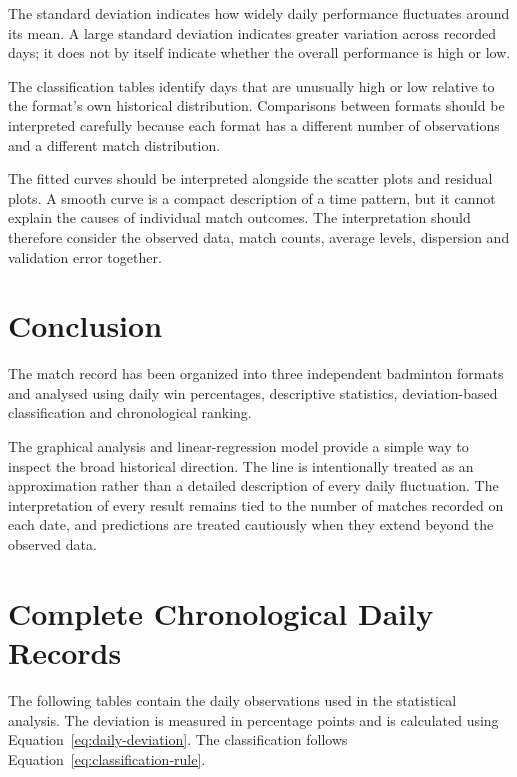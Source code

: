 \documentclass[journal]{IEEEtran}
\numberwithin{equation}{subsection}
\begin{document}
The standard deviation indicates how widely daily performance
fluctuates around its mean. A large standard deviation
indicates greater variation across recorded days; it does not
by itself indicate whether the overall performance is high
or low.

The classification tables identify days that are unusually
high or low relative to the format's own historical
distribution. Comparisons between formats should be interpreted
carefully because each format has a different number of
observations and a different match distribution.

The fitted curves should be interpreted alongside the
scatter plots and residual plots. A smooth curve is a compact
description of a time pattern, but it cannot explain the
causes of individual match outcomes. The interpretation should
therefore consider the observed data, match counts, average
levels, dispersion and validation error together.

\section{Conclusion}

The match record has been organized into three independent
badminton formats and analysed using daily win percentages,
descriptive statistics, deviation-based classification and
chronological ranking.

The graphical analysis and linear-regression model provide
a simple way to inspect the broad historical direction. The
line is intentionally treated as an approximation rather than
a detailed description of every daily fluctuation. The interpretation of every result remains tied to
the number of matches recorded on each date, and predictions
are treated cautiously when they extend beyond the observed
data.

\appendices

\section{Complete Chronological Daily Records}
\label{app:daily-records}

The following tables contain the daily observations used in
the statistical analysis. The deviation is measured in
percentage points and is calculated using
Equation~\ref{eq:daily-deviation}. The classification follows
Equation~\ref{eq:classification-rule}.
\end{document}
